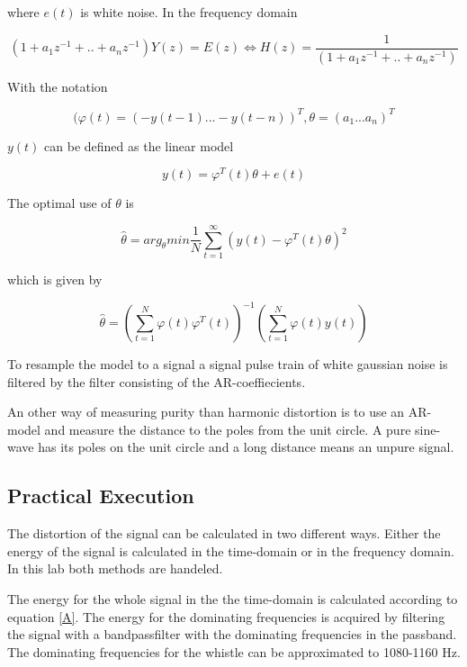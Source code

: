 \documentclass[12pt]{article}
\begin{document}
where $e(t)$ is white noise. In the frequency domain

\begin{equation}
\label{Hfreq}
(1+a_1z^{-1}+..+a_nz^{-1})Y(z)=E(z) \Leftrightarrow H(z) = \frac{1}{(1+a_1z^{-1}+..+a_nz^{-1})}
\end{equation}


With the notation

\begin{equation}
(\varphi(t) =(-y(t-1) ... -y(t-n))^T,\theta = (a_1 ... a_n)^T 
\end{equation}

$y(t)$ can be defined as the linear model

\begin{equation}
y(t)=\varphi^T(t)\theta+ e(t)
\end{equation}

The optimal use of $\theta$ is

\begin{equation}
\hat{\theta}=arg_{\theta}min \frac{1}{N}\sum_{t=1}^{\infty}(y(t)-\varphi^T(t)\theta)^2
\end{equation}

which is given by

\begin{equation}
\hat{\theta}=\left(\sum_{t=1}^N\varphi(t)\varphi^T(t)\right)^{-1}\left(\sum_{t=1}^N\varphi(t)y(t)\right)
\label{enwhis}
\end{equation}

To resample the model to a signal a signal pulse train of white gaussian noise is filtered by the filter consisting of the AR-coeffiecients.

An other way of measuring purity than harmonic distortion is to use an AR-model and measure the distance to the poles from the unit circle. A pure sine-wave has its poles on the unit circle and a long distance means an unpure signal.




\subsection{Practical Execution}
The distortion of the signal can be calculated in two different ways. Either the energy of the signal is calculated in the time-domain or in the frequency domain. In this lab both methods are handeled.

The energy for the whole signal in the the time-domain is calculated according to equation \ref{A}. The energy for the dominating frequencies is acquired by filtering the signal with a bandpassfilter with the dominating frequencies in the passband. The dominating frequencies for the whistle can be approximated to 1080-1160 Hz. 
\end{document}
